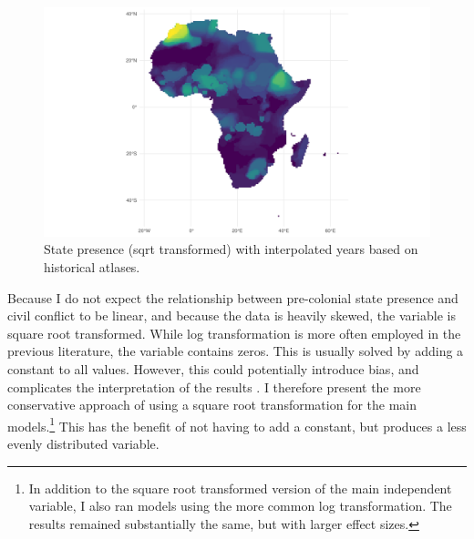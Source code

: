 
\begin{figure}[htpb]
	\centering
	\includegraphics[width=\linewidth]{../R/Output/sqrtSpAll.pdf}
	\caption{State presence (sqrt transformed) with interpolated years based
	on historical atlases.}
	\label{Sp_i}
\end{figure}


Because I do not expect the relationship between pre-colonial state presence and
civil conflict to be linear, and because the data is heavily skewed, the
variable is square root transformed. While log transformation is more often
employed in the previous literature, the variable contains zeros. This is
usually solved by adding a constant to all values. However, this could
potentially introduce bias, and complicates the interpretation of the results
\citep{Ekwaru_2018}. I therefore present the more conservative approach of using
a square root transformation for the main models.\footnote{In addition to the
	square root transformed version of the main independent variable, I also
	ran models using the more common log transformation. The results
remained substantially the same, but with larger effect sizes.} This has the
benefit of not having to add a constant, but produces a less evenly distributed
variable. 

